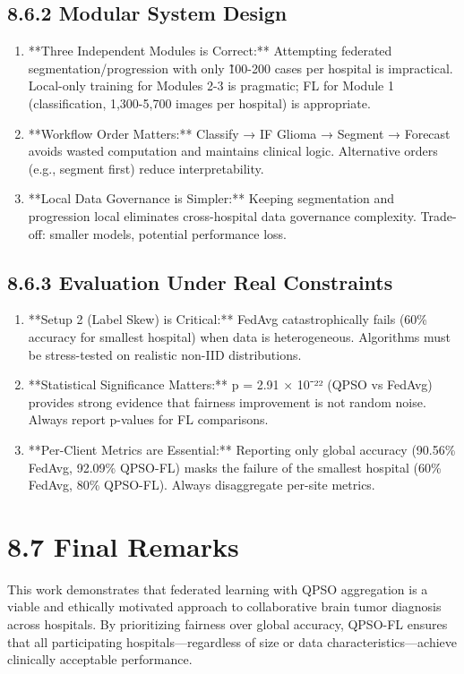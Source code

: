 \subsection{8.6.2 Modular System Design}
\begin{enumerate}
  \item **Three Independent Modules is Correct:** Attempting federated segmentation/progression with only \~100-200 cases per hospital is impractical. Local-only training for Modules 2-3 is pragmatic; FL for Module 1 (classification, 1,300-5,700 images per hospital) is appropriate.
  \item **Workflow Order Matters:** Classify → IF Glioma → Segment → Forecast avoids wasted computation and maintains clinical logic. Alternative orders (e.g., segment first) reduce interpretability.
  \item **Local Data Governance is Simpler:** Keeping segmentation and progression local eliminates cross-hospital data governance complexity. Trade-off: smaller models, potential performance loss.
\end{enumerate}


\subsection{8.6.3 Evaluation Under Real Constraints}
\begin{enumerate}
  \item **Setup 2 (Label Skew) is Critical:** FedAvg catastrophically fails (60\% accuracy for smallest hospital) when data is heterogeneous. Algorithms must be stress-tested on realistic non-IID distributions.
  \item **Statistical Significance Matters:** p = 2.91 × 10⁻²² (QPSO vs FedAvg) provides strong evidence that fairness improvement is not random noise. Always report p-values for FL comparisons.
  \item **Per-Client Metrics are Essential:** Reporting only global accuracy (90.56\% FedAvg, 92.09\% QPSO-FL) masks the failure of the smallest hospital (60\% FedAvg, 80\% QPSO-FL). Always disaggregate per-site metrics.
\end{enumerate}


\section{8.7 Final Remarks}
This work demonstrates that federated learning with QPSO aggregation is a viable and ethically motivated approach to collaborative brain tumor diagnosis across hospitals. By prioritizing fairness over global accuracy, QPSO-FL ensures that all participating hospitals—regardless of size or data characteristics—achieve clinically acceptable performance.

